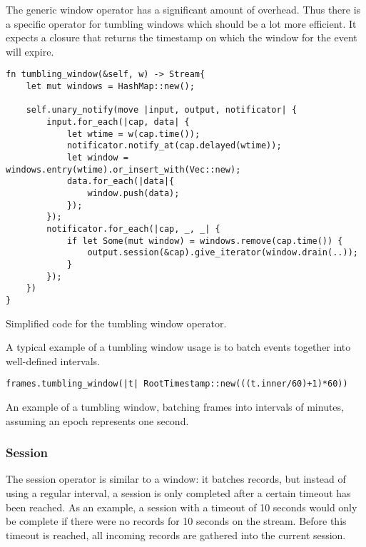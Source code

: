 The generic window operator has a significant amount of overhead. Thus there is a specific operator for tumbling windows which should be a lot more efficient. It expects a closure that returns the timestamp on which the window for the event will expire.

\begin{listing}[H]
\begin{verbatim}
fn tumbling_window(&self, w) -> Stream{
    let mut windows = HashMap::new();
    
    self.unary_notify(move |input, output, notificator| {
        input.for_each(|cap, data| {
            let wtime = w(cap.time());
            notificator.notify_at(cap.delayed(wtime));
            let window = windows.entry(wtime).or_insert_with(Vec::new);
            data.for_each(|data|{
                window.push(data);
            });
        });
        notificator.for_each(|cap, _, _| {
            if let Some(mut window) = windows.remove(cap.time()) {
                output.session(&cap).give_iterator(window.drain(..));
            }
        });
    })
}
\end{verbatim}
  \caption{Simplified code for the tumbling window operator.}
  \label{lst:tumbling-window}
\end{listing}

A typical example of a tumbling window usage is to batch events together into well-defined intervals.

\begin{listing}[H]
\begin{verbatim}
frames.tumbling_window(|t| RootTimestamp::new(((t.inner/60)+1)*60))
\end{verbatim}
\caption{An example of a tumbling window, batching frames into intervals of minutes, assuming an epoch represents one second.}
\label{lst:tumbling-window-example}
\end{listing}

\subsubsection{Session}
The session operator is similar to a window: it batches records, but instead of using a regular interval, a session is only completed after a certain timeout has been reached. As an example, a session with a timeout of 10 seconds would only be complete if there were no records for 10 seconds on the stream. Before this timeout is reached, all incoming records are gathered into the current session.

